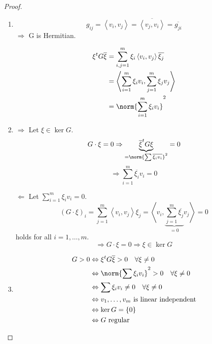 \documentclass[a4paper,landscape,twocolumn]{article}
\newcommand\set[1]{\left\{#1\right\}}
\newcommand\functional[1]{\left\langle{#1}\right\rangle}
\DeclareMathOperator\kernel{ker} %
\DeclarePairedDelimiter\norm\lVert\rVert
\begin{document}
\begin{proof}
  \begin{enumerate}
    \item
      \[ g_{ij} = \functional{v_i, v_j} = \overline{\functional{v_j, v_i}} = \overline{g_{ji}} \]
      $\Rightarrow$ G is Hermitian.

      \begin{align*}
        \xi^t G \overline{\xi} &= \sum_{i,j=1}^m \xi_i \functional{v_i, v_j} \overline{\xi_j} \\
          &= \functional{\sum_{i=1}^m \xi_i v_i, \sum_{j=1}^m \xi_j v_j} \\
          &= \norm{\sum_{i=1}^m \xi_i v_i}^2
      \end{align*}
    \item $\Rightarrow$
      Let $\xi \in \kernel{G}$.
      \[ G \cdot \xi = 0 \Rightarrow \underbrace{\overline{\xi}^t G \xi}_{= \norm{\sum \overline{\xi_i v_i}}^2} = 0 \]
      \[ \Rightarrow \sum_{i=1}^m \overline{\xi_i} v_i = 0 \]

      $\Leftarrow$
      Let $\sum_{i=1}^m \xi_i v_i = 0$.
      \[
        (G \cdot \xi)_i = \sum_{j=1}^m \functional{v_i, v_j} \xi_j
        = \functional{v_i, \underbrace{\sum_{j=1}^m \overline{\xi_j}}_{=0} v_j} = 0
      \]
      holds for all $i = 1,\ldots,m$.
      \[ \Rightarrow G \cdot \xi = 0 \Rightarrow \xi \in \kernel{G} \]
    \item
      \begin{align*}
        G > 0 &\Leftrightarrow \xi^t G \overline{\xi} > 0 \quad \forall \xi \neq 0 \\
          &\Leftrightarrow \norm{\sum \xi_i v_i}^2 > 0 \quad \forall \xi \neq 0 \\
          &\Leftrightarrow \sum \xi_i v_i \neq 0 \quad \forall \xi \neq 0 \\
          &\Leftrightarrow v_1,\ldots,v_m \text{ is linear independent} \\
          &\Leftrightarrow \kernel{G} = \set{0} \\
          &\Leftrightarrow G \text{ regular}
      \end{align*}
  \end{enumerate}
\end{proof}

\clearpage
\begin{otherlanguage}{ngerman}
\printindex[German]
\end{otherlanguage}
\printindex[English]
\end{document}
